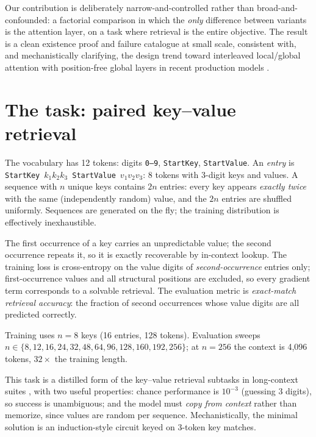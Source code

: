 \documentclass[10pt]{article}
\begin{document}
Our contribution is deliberately narrow-and-controlled rather than
broad-and-confounded: a factorial comparison in which the \emph{only}
difference between variants is the attention layer, on a task where
retrieval is the entire objective. The result is a clean existence proof
and failure catalogue at small scale, consistent with, and mechanistically clarifying, the design trend toward interleaved local/global attention
with position-free global layers in recent production models
\citep{gemmateam2024gemma2,meta2025llama4}.

\section{The task: paired key--value retrieval}
\label{sec:task}

The vocabulary has 12 tokens: digits \texttt{0--9}, \texttt{StartKey},
\texttt{StartValue}. An \emph{entry} is
\texttt{StartKey}~$k_1 k_2 k_3$~\texttt{StartValue}~$v_1 v_2 v_3$: 8 tokens with $3$-digit keys and values. A sequence with $n$ unique
keys contains $2n$ entries: every key appears \emph{exactly twice} with
the same (independently random) value, and the $2n$ entries are shuffled
uniformly. Sequences are generated on the fly; the training distribution
is effectively inexhaustible.

The first occurrence of a key carries an unpredictable value; the second
occurrence repeats it, so it is exactly recoverable by in-context lookup.
The training loss is cross-entropy on the value digits of
\emph{second-occurrence} entries only; first-occurrence values and all
structural positions are excluded, so every gradient term corresponds to a
solvable retrieval. The evaluation metric is \emph{exact-match retrieval
accuracy}: the fraction of second occurrences whose value digits are all
predicted correctly.

Training uses $n=8$ keys (16 entries, 128 tokens). Evaluation sweeps
$n \in \{8, 12, 16, 24, 32, 48, 64, 96, 128, 160, 192, 256\}$; at
$n=256$ the context is 4{,}096 tokens, $32\times$ the training length.

This task is a distilled form of the key--value retrieval subtasks in
long-context suites \citep{hsieh2024ruler,kamradt2023needle}, with two
useful properties: chance performance is $10^{-3}$ (guessing 3 digits), so
success is unambiguous; and the model must \emph{copy from context} rather
than memorize, since values are random per sequence. Mechanistically, the
minimal solution is an induction-style circuit \citep{olsson2022context}
keyed on 3-token key matches.
\end{document}
